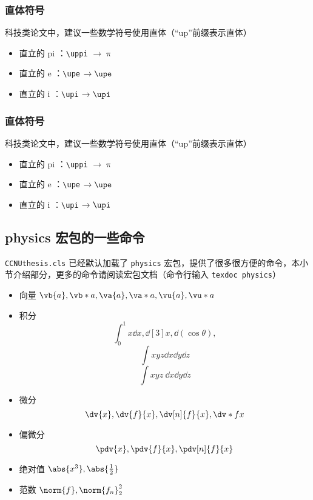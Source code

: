 \subsubsection{直体符号}

  科技类论文中，建议一些数学符号使用直体（“up”前缀表示直体）
    \begin{itemize}
      \item 直立的 pi ：\verb|\uppi| $\to \uppi$
      \item 直立的 e ：\verb|\upe| $\to \upe$
      \item 直立的 i ：\verb|\upi| $\to \upi$
    \end{itemize}

  
\subsubsection{直体符号}

科技类论文中，建议一些数学符号使用直体（“up”前缀表示直体）
  \begin{itemize}
    \item 直立的 pi ：\verb|\uppi| $\to \uppi$
    \item 直立的 e ：\verb|\upe| $\to \upe$
    \item 直立的 i ：\verb|\upi| $\to \upi$
  \end{itemize}

\subsection{physics 宏包的一些命令}

\verb|CCNUthesis.cls| 已经默认加载了 \verb|physics| 宏包，提供了很多很方便的命令，本小节介绍部分，更多的命令请阅读宏包文档（命令行输入 \verb|texdoc physics|）

\begin{itemize}
  \item 向量 $\vb{a}, \vb*{a}, \va{a}, \va*{a}, \vu{a}, \vu*{a}$
  \item 积分
    \[
      \int_{0}^{1} x \dd{x},
      \dd[3]{x}, \dd(\cos\theta),
    \]
    \[
      \int xyz \dd{x} \dd{y} \dd{z}
    \]
    \[
      \int xyz \ \dd x \dd y \dd z    
    \]
  \item 微分
    \[
      \dv{x}, \dv{f}{x}, \dv[n]{f}{x}, \dv*{f}{x}
    \]
  \item 偏微分
    \[
      \pdv{x}, \pdv{f}{x}, \pdv[n]{f}{x}
    \]
  \item 绝对值 $\abs{x^3}, \abs{\frac{1}{2}}$
  \item 范数 $\norm{f}, \norm{f_n}_{2}^{2}$
\end{itemize}



